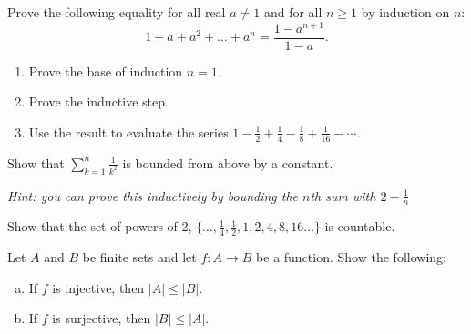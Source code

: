 \documentclass[11pt]{article}
\begin{document}
    \pagestyle{fancy}
    \fancyfoot[C]{}
    \fancyfoot[R]{\thepage}
    \renewcommand{\headrulewidth}{0.4pt}
    \renewcommand{\footrulewidth}{2pt}
    
	

    \begin{tcolorbox}[title={Problem 1A (Summations, A.1-4)}]
    Prove the following equality for all real $a \neq 1$ and for all $n \geq 1$ by induction on $n$:
    $$
    1 + a + a^2 + \ldots + a^n = \frac{1-a^{n+1}}{1-a}.
    $$
    \begin{enumerate}
        \item Prove the base of induction $n=1$.
        \item Prove the inductive step.
        \item Use the result to evaluate the series $1 - \frac{1}{2} + \frac{1}{4} - \frac{1}{8}+\frac{1}{16}-\cdots$.
    \end{enumerate}
    \end{tcolorbox}
    
    \newpage
    \begin{tcolorbox}[title={Problem 1B (Bounds, A.2-1)}]
        Show that $\sum_{k=1}^n \frac{1}{k^2}$ is bounded from above by a constant.
        
        {\it Hint: you can prove this inductively by bounding the $n$th sum with $2-\frac{1}{n}$}
    \end{tcolorbox}
    
    \newpage
    
    \begin{tcolorbox}[title={Problem 2A (Sets, B.1-4)}]
        Show that the set of powers of 2, $\{\ldots,\frac{1}{4},\frac{1}{2},1,2,4,8,16\ldots\}$ is countable.
    \end{tcolorbox}
    
    \newpage
    \begin{tcolorbox}[title={Problem 2B (Functions, B.3-1)}]
       Let $A$ and $B$ be finite sets and let $f:A\to B$ be a function. Show the following:
       \begin{enumerate}[(a)]
           \item If $f$ is injective, then $|A|\le |B|$.
           \item If $f$ is surjective, then $|B| \le |A|$.
       \end{enumerate}
    \end{tcolorbox}
    
\end{document}
